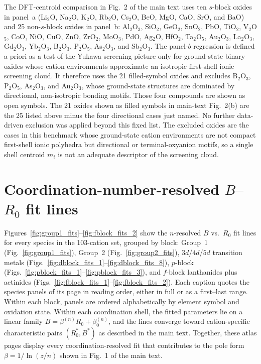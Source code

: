 \documentclass[aps,prmaterials,twocolumn,10pt,superscriptaddress,floatfix]{revtex4-2}
\providecommand{\texorpdfstring}[2]{#1}
\begin{document}
The DFT-centroid comparison in Fig.~2 of the main text uses ten $s$-block oxides in
panel~a (Li$_2$O, Na$_2$O, K$_2$O, Rb$_2$O, Cs$_2$O, BeO, MgO, CaO,
SrO, and BaO) and 25 non-$s$-block oxides in panel~b: Al$_2$O$_3$,
SiO$_2$, GeO$_2$, SnO$_2$, PbO, TiO$_2$, V$_2$O$_5$, CoO, NiO, CuO,
ZnO, ZrO$_2$, MoO$_3$, PdO, Ag$_2$O, HfO$_2$, Ta$_2$O$_5$, Au$_2$O$_3$,
La$_2$O$_3$, Gd$_2$O$_3$, Yb$_2$O$_3$, B$_2$O$_3$, P$_2$O$_5$,
As$_2$O$_3$, and Sb$_2$O$_3$.  The panel-$b$ regression is defined
a priori as a test of the Yukawa screening picture only for
ground-state binary oxides whose cation environments approximate an
isotropic first-shell ionic screening cloud.  It therefore uses the 21
filled-symbol oxides and excludes B$_2$O$_3$, P$_2$O$_5$,
As$_2$O$_3$, and Au$_2$O$_3$, whose ground-state structures are dominated by
directional, non-isotropic bonding motifs.  Those four compounds are shown
as open symbols.  The 21 oxides shown as filled symbols in main-text Fig.~2(b)
are the 25 listed above minus the four directional cases just named.
No further data-driven exclusion was applied beyond this fixed list.  The excluded oxides are the cases in this benchmark whose
ground-state cation environments are not compact first-shell ionic
polyhedra but directional or terminal-oxyanion motifs, so a single
shell centroid $m_i$ is not an adequate descriptor of the screening
cloud.

\section{\texorpdfstring{Coordination-number-resolved $B$--$R_0$ fit lines}{Coordination-number-resolved B-R0 fit lines}}

Figures~\ref{fig:group1_fits}--\ref{fig:fblock_fits_2} show the
$n$-resolved $B$ vs.\ $R_0$ fit lines for every species in the
103-cation set, grouped by block: Group~1 (Fig.~\ref{fig:group1_fits}),
Group~2 (Fig.~\ref{fig:group2_fits}), $3d$/$4d$/$5d$ transition metals
(Figs.~\ref{fig:dblock_fits_1}--\ref{fig:dblock_fits_8}), $p$-block
(Figs.~\ref{fig:pblock_fits_1}--\ref{fig:pblock_fits_3}), and $f$-block
lanthanides plus actinides
(Figs.~\ref{fig:fblock_fits_1}--\ref{fig:fblock_fits_2}).  Each
caption quotes the species panels of its page in reading order, either
in full or as a first--last range.  Within each block, panels are
ordered alphabetically by element symbol and oxidation state.  Within each
coordination shell, the fitted parameters lie on a linear family
$B=\beta^{(n)}R_0+\beta_0^{(n)}$, and the lines converge toward
cation-specific characteristic pairs $(R_0^*,B^*)$ as described in the
main text.  Together, these atlas pages display every coordination-resolved
fit that contributes to the pole form $\beta=1/\ln(z/n)$ shown in
Fig.~1 of the main text.
\end{document}
